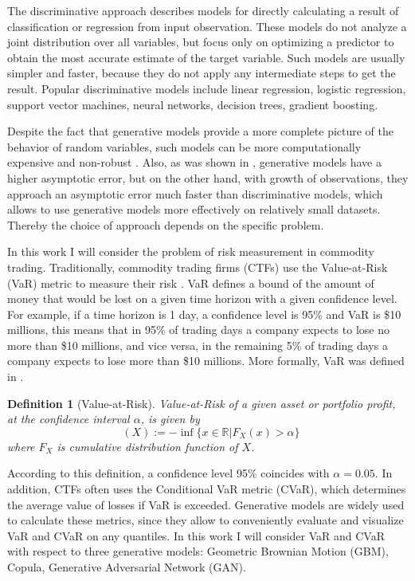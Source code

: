 \documentclass{article}
\newtheorem{definition}{Definition}[section]
\DeclareMathOperator{\VaR}{VaR_\alpha}
\begin{document}
The discriminative approach describes models for directly calculating a result of classification or regression from input observation. These models do not analyze a joint distribution over all variables, but focus only on optimizing a predictor to obtain the most accurate estimate of the target variable. Such models are usually simpler and faster, because they do not apply any intermediate steps to get the result. Popular discriminative models include linear regression, logistic regression, support vector machines, neural networks, decision trees, gradient boosting.

Despite the fact that generative models provide a more complete picture of the behavior of random variables, such models can be more computationally expensive and non-robust \cite{jebara}. Also, as was shown in \cite{Ng2002}, generative models have a higher asymptotic error, but on the other hand, with growth of observations, they approach an asymptotic error much faster than discriminative models, which allows to use generative models more effectively on relatively small datasets. Thereby the choice of approach depends on the specific problem. 

In this work I will consider the problem of risk measurement in commodity trading. Traditionally, commodity trading firms (CTFs) use the Value-at-Risk (VaR) metric to measure their risk \cite{Pirrong}. VaR defines a bound of the amount of money that would be lost on a given time horizon with a given confidence level. For example, if a time horizon is 1 day, a confidence level is 95\% and VaR is \$10 millions, this means that in 95\% of trading days a company expects to lose no more than \$10 millions, and vice versa, in the remaining 5\% of trading days a company expects to lose more than \$10 millions. More formally, VaR was defined in \cite{Artzner1999}.
\begin{definition}[Value-at-Risk]
    Value-at-Risk of a given asset or portfolio profit, at the confidence interval $\alpha$, is given by
$$\VaR(X) := -\inf\{ x \in \mathbb R | F_X(x) > \alpha\}$$
where $F_X$ is cumulative distribution function of $X$. 
\end{definition}

According to this definition, a confidence level 95\% coincides with $\alpha = 0.05$.  In addition, CTFs often uses the Conditional VaR metric (CVaR), which determines the average value of losses if VaR is exceeded. Generative models are widely used to calculate these metrics, since they allow to conveniently evaluate and visualize VaR and CVaR on any quantiles. In this work I will consider VaR and CVaR with respect to three generative models: Geometric Brownian Motion (GBM), Copula, Generative Adversarial Network (GAN).
\end{document}

